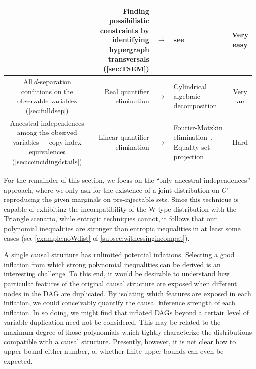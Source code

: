 {\begin{table}[ht]
\begin{tabularx}{\linewidth}{ |c|RlL|c| }
	& Finding possibilistic constraints \linebreak by identifying hypergraph transversals (\cref{sec:TSEM}) & $\to$ & see~\citet{eiter_dualization_2008} & Very easy \\

\hline
\parbox{5cm}{All $d$-separation conditions on the observable variables (\cref{sec:fulldsep})} & Real quantifier elimination & $\to$ & Cylindrical algebraic decomposition~\cite{ChavesPolynomial} & Very hard \\

\hline
\parbox{5cm}{Ancestral independences among the observed variables + copy-index equivalences (\cref{sec:coincidingdetails})} & Linear quantifier elimination & $\to$ & Fourier-Motzkin elimination~\cite{fordan1999projection,DantzigEaves,Bastrakov2015,BalasProjectionCone,Jones2008}, \linebreak Equality set projection \cite{JonesThesis2005,jones2004equality} & Hard \\

\bottomrule
\end{tabularx}
\label{table:difficulties}
\end{table}

For the remainder of this section, we focus on the ``only ancestral independences'' approach, where we only ask for the existence of a joint distribution on $G'$ reproducing the given marginals on pre-injectable sets.
Since this technique is capable of exhibiting the incompatibility of the W-type distribution with the Triangle scenario, while entropic techniques cannot, it follows that our polynomial inequalities are stronger than entropic inequalities in at least some cases (see \cref{example:noWdist} of \cref{subsec:witnessingincompat}).   

A single causal structure has unlimited potential inflations. Selecting a good inflation from which strong polynomial inequalities can be derived is an interesting challenge. To this end, it would be desirable to understand how particular features of the original causal structure are exposed when different nodes in the DAG are duplicated. By isolating which features are exposed in each inflation, we could conceivably quantify the causal inference strength of each inflation. In so doing, we might find that inflated DAGs beyond a certain level of variable duplication need not be considered. This may be related to the maximum degree of those polynomials which tightly characterize the distributions compatible with a causal structure. Presently, however, it is not clear how to upper bound either number, or whether finite upper bounds can even be expected.


}
